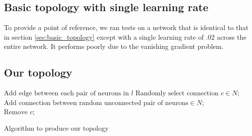 \documentclass[format=sigconf]{acmart}
\begin{document}
\subsection{Basic topology with single learning rate}
\label{sec:basic_topology_uniform}

To provide a point of reference, we ran tests on a network that is identical to that in section \ref{sec:basic_topology} except with a single learning rate of .02 across the entire network. It performs poorly due to the vanishing gradient problem.

\subsection{Our topology}
\label{sec:our_topology}


\begin{algorithm}
{
	$\text{Add edge between each pair of neurons in }l$
}
{
	$\text{Randomly select connection }c\in N$;\\
	$\text{Add connection between random unconnected pair of neurons}\in N$;\\
	$\text{Remove }c$;
}

\caption{Algorithm to produce our topology}
\label{alg:ourtop}
\end{algorithm}
\end{document}
